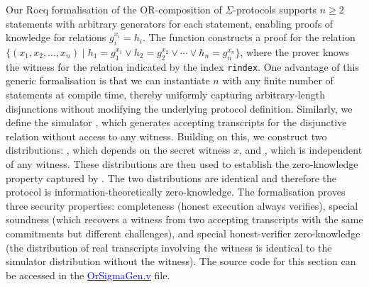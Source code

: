 \documentclass[sigconf, anonymous]{acmart}
\begin{document}
Our Rocq formalisation of the OR-composition of $\Sigma$-protocols supports $n \geq 2$ statements with arbitrary generators for each statement, enabling proofs of knowledge for relations $g_i^{x_i} = h_i$. The function \texttt{} constructs a proof for the relation
$\{ (x_1, x_2, \ldots, x_n) \mid h_1 = g_1^{x_1} \lor h_2 = g_2^{x_2} \lor \cdots \lor h_n = g_n^{x_n} \}$, 
where the prover knows the witness for the relation indicated by the index \texttt{rindex}. One advantage of this generic formalisation is that we can instantiate \( n \) with any finite number of statements at compile time, thereby uniformly capturing arbitrary-length disjunctions without modifying the underlying protocol definition.  Similarly, we define the simulator \texttt{}, which generates accepting transcripts for the disjunctive relation without access to any witness. Building on this, we construct two distributions: \texttt{}, which depends on the secret witness \(x\), and \texttt{}, which is independent of any witness. These distributions are then used to establish the zero-knowledge property captured by \texttt{}. The two distributions are identical and therefore the protocol is information-theoretically zero-knowledge. The formalisation proves three security properties: completeness (honest execution always verifies), special soundness (which recovers a witness from two accepting transcripts with the same commitments but different challenges), and special honest-verifier zero-knowledge (the distribution of real transcripts involving the witness is identical to the simulator distribution without the witness). The source code for this section can be accessed in the \href{https://anonymous.4open.science/r/SigmaProtocol-EBA5/src/Crypto/OrSigmaGen.v}{\textcolor{blue}{OrSigmaGen.v}} file.
\end{document}
